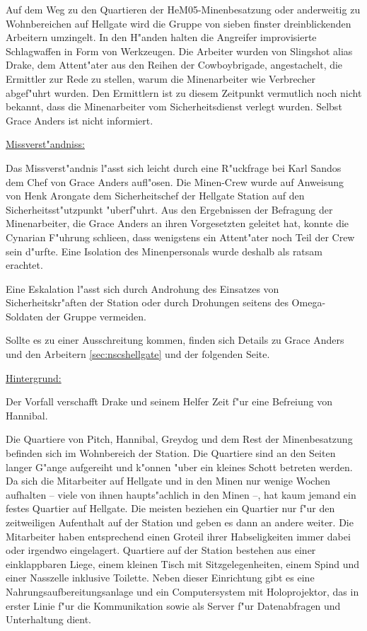                               
Auf dem Weg zu den Quartieren der HeM05-Minenbesatzung oder anderweitig zu Wohnbereichen auf Hellgate wird die Gruppe von sieben finster dreinblickenden Arbeitern umzingelt. In den H"anden halten die Angreifer improvisierte Schlagwaffen in Form von Werkzeugen. Die Arbeiter wurden von Slingshot alias Drake, dem Attent"ater aus den Reihen der Cowboybrigade, angestachelt, die Ermittler zur Rede zu stellen, warum die Minenarbeiter wie Verbrecher abgef"uhrt wurden. Den Ermittlern ist zu diesem Zeitpunkt vermutlich noch nicht bekannt, dass die Minenarbeiter vom Sicherheitsdienst verlegt wurden. Selbst Grace Anders ist nicht informiert.
\vfill\pagebreak

\begin{remarks}
	\underline{Missverst"andniss:}

	Das Missverst"andnis l"asst sich leicht durch eine R"uckfrage bei Karl Sandos dem Chef von Grace Anders aufl"osen. Die Minen-Crew wurde auf Anweisung von Henk Arongate dem Sicherheitschef der Hellgate Station auf den Sicherheitsst"utzpunkt "uberf"uhrt. Aus den Ergebnissen der Befragung der Minenarbeiter, die Grace Anders an ihren Vorgesetzten geleitet hat, konnte die Cynarian F"uhrung schlie\3en, dass wenigstens ein Attent"ater noch Teil der Crew sein d"urfte. Eine Isolation des Minenpersonals wurde deshalb als ratsam erachtet.

	Eine Eskalation l"asst sich durch Androhung des Einsatzes von Sicherheitskr"aften der Station oder durch Drohungen seitens des Omega-Soldaten der Gruppe vermeiden. 

	Sollte es zu einer Ausschreitung kommen, finden sich Details zu Grace Anders und den Arbeitern \cref{sec:nscshellgate} und der folgenden Seite.

	\underline{Hintergrund:}

	Der Vorfall verschafft Drake und seinem Helfer Zeit f"ur eine Befreiung von Hannibal.
\end{remarks}


Die Quartiere von Pitch, Hannibal, Greydog und dem Rest der Minenbesatzung befinden sich im Wohnbereich der Station. Die Quartiere sind an den Seiten langer G"ange aufgereiht und k"onnen "uber ein kleines Schott betreten werden. Da sich die Mitarbeiter auf Hellgate und in den Minen nur wenige Wochen aufhalten -- viele von ihnen haupts"achlich in den Minen --, hat kaum jemand ein festes Quartier auf Hellgate. Die meisten beziehen ein Quartier nur f"ur den zeitweiligen Aufenthalt auf der Station und geben es dann an andere weiter. Die Mitarbeiter haben entsprechend einen Gro\3teil ihrer Habseligkeiten immer dabei oder irgendwo eingelagert. Quartiere auf der Station bestehen aus einer einklappbaren Liege, einem kleinen Tisch mit Sitzgelegenheiten, einem Spind und einer Nasszelle inklusive Toilette. Neben dieser Einrichtung gibt es eine Nahrungsaufbereitungsanlage und ein Computersystem mit Holoprojektor, das in erster Linie f"ur die Kommunikation sowie als Server f"ur Datenabfragen und Unterhaltung dient.

